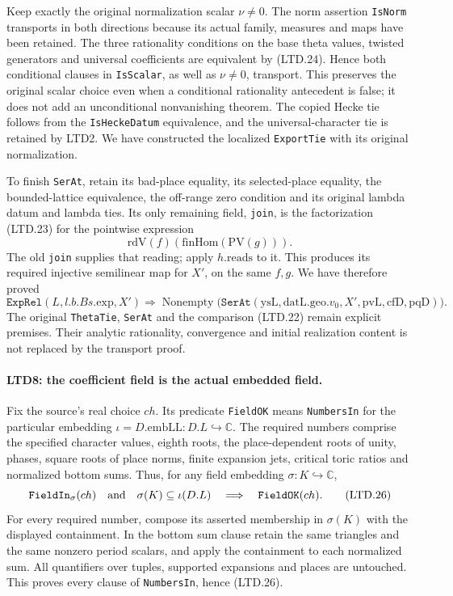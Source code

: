 Keep exactly the original normalization scalar \(\nu\ne0\).
The norm assertion \texttt{IsNorm} transports in both directions
because its actual family, measures and maps have been retained.
The three rationality conditions on the base theta values,
twisted generators and universal coefficients are equivalent
by (LTD.24).  Hence both conditional clauses in
\texttt{IsScalar}, as well as \(\nu\ne0\), transport.  This
preserves the original scalar choice even when a conditional
rationality antecedent is false; it does not add an unconditional
nonvanishing theorem.  The copied Hecke tie follows from the
\texttt{IsHeckeDatum} equivalence, and the universal-character
tie is retained by LTD2.  We have constructed the localized
\texttt{ExportTie} with its original normalization.

To finish \texttt{SerAt}, retain its bad-place equality, its
selected-place equality, the bounded-lattice equivalence, the
off-range zero condition and its original lambda datum and
lambda ties.  Its only remaining field, \texttt{join}, is the
factorization (LTD.23) for the pointwise expression
\[
                 \mathrm{rdV}(f)(\mathrm{finHom}(\mathrm{PV}(g))).
\]
The old \texttt{join} supplies that reading; apply
\(h.\mathrm{reads}\) to it.  This produces its required
injective semilinear map for \(X'\), on the same \(f,g\).
We have therefore proved
\[
 \texttt{ExpRel}(L,l.b.Bs.\mathrm{exp},X')
  \Longrightarrow
 \operatorname{Nonempty}\bigl(\texttt{SerAt}
     (\mathrm{ysL},\mathrm{datL}.\mathrm{geo}.v_0,
                     X',\mathrm{pvL},\mathrm{cfD},\mathrm{pqD})\bigr).
 \tag{LTD.25}
\]
The original \texttt{ThetaTie}, \texttt{SerAt} and the comparison
(LTD.22) remain explicit premises.  Their analytic rationality,
convergence and initial realization content is not replaced
by the transport proof.

\paragraph{LTD8: the coefficient field is the actual embedded field.}
\label{claim:LTD8}
Fix the source's real choice \(ch\).  Its predicate
\texttt{FieldOK} means \texttt{NumbersIn} for the particular
embedding \(\iota=D.\mathrm{embLL}:D.L\hookrightarrow\mathbb C\).
The required numbers comprise the specified character values,
eighth roots, the place-dependent roots of unity, phases,
square roots of place norms, finite expansion jets, critical
toric ratios and normalized bottom sums.  Thus, for any field
embedding \(\sigma:K\hookrightarrow\mathbb C\),
\[
 \texttt{FieldIn}_\sigma(ch)\quad\hbox{and}\quad
 \sigma(K)\subseteq\iota(D.L)
       \quad\Longrightarrow\quad\texttt{FieldOK}(ch).            \tag{LTD.26}
\]
For every required number, compose its asserted membership in
\(\sigma(K)\) with the displayed containment.  In the bottom
sum clause retain the same triangles and the same nonzero
period scalars, and apply the containment to each normalized
sum.  All quantifiers over tuples, supported expansions and
places are untouched.  This proves every clause of
\texttt{NumbersIn}, hence (LTD.26).

